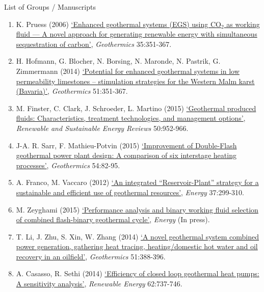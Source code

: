 \documentclass[12pts,a4paper]{report}%
\begin{document}
\clearpage

\begin{center}
{\Large List of Groups / Manuscripts}
\end{center}


\begin{enumerate}[label=\bfseries Paper \arabic*:]
%
\item K. Pruess (2006) \href{http://dx.doi.org/10.1016/j.geothermics.2006.08.002}{`Enhanced geothermal systems (EGS) using CO$_{2}$ as working fluid — A novel approach for generating renewable energy with simultaneous sequestration of carbon'}, {\it Geothermics} 35:351-367.
%
\item H. Hofmann, G. Blocher, N. Borsing, N. Maronde, N. Pastrik, G. Zimmermann (2014) \href{http://dx.doi.org/10.1016/j.geothermics.2014.03.003}{`Potential for enhanced geothermal systems in low permeability limestones – stimulation strategies for the Western Malm karst (Bavaria)'}, {\it Geothermics} 51:351-367.
%
\item M. Finster, C. Clark, J. Schroeder, L. Martino (2015) \href{http://dx.doi.org/10.1016/j.rser.2015.05.059}{`Geothermal produced fluids: Characteristics, treatment technologies, and management options'}, {\it Renewable and Sustainable Energy Reviews} 50:952-966.
%
\item J-A. R. Sarr, F. Mathieu-Potvin (2015) \href{http://dx.doi.org/10.1016/j.geothermics.2014.12.002}{`Improvement of Double-Flash geothermal power plant design: A comparison of six interstage heating processes'}, {\it Geothermics} 54:82-95.
%
\item A. Franco, M. Vaccaro (2012) \href{http://dx.doi.org/10.1016/j.energy.2011.11.029}{`An integrated “Reservoir-Plant” strategy for a sustainable and efficient use of geothermal resources'}, {\it Energy} 37:299-310.
%
\item M. Zeyghami (2015) \href{http://dx.doi.org/10.1016/j.energy.2015.05.092}{`Performance analysis and binary working fluid selection of combined flash-binary geothermal cycle'}, {\it Energy} (In press).
%
\item T. Li, J. Zhu, S. Xin, W. Zhang (2014) \href{http://dx.doi.org/10.1016/j.geothermics.2014.03.009}{`A novel geothermal system combined power generation, gathering heat tracing, heating/domestic hot water and oil recovery in an oilfield'}, {\it Geothermics} 51:388-396.
%
\item A. Casasso, R. Sethi (2014) \href{http://dx.doi.org/10.1016/j.renene.2013.08.019}{`Efficiency of closed loop geothermal heat pumps: A sensitivity analysis'}, {\it Renewable Energy} 62:737-746.

\end{enumerate}
\end{document}
